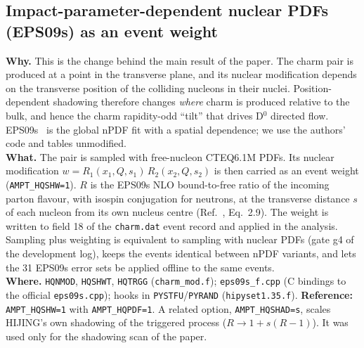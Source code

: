 \documentclass[11pt,a4paper]{article}
\newcommand{\sw}[1]{\texttt{#1}}
\newcommand{\code}[1]{\texttt{#1}}
\begin{document}
\subsection{Impact-parameter-dependent nuclear PDFs (EPS09s) as an event weight}
\textbf{Why.} This is the change behind the main result of the paper. The charm pair is produced at a point in the
transverse plane, and its nuclear modification depends on the transverse position of the colliding nucleons in
their nuclei. Position-dependent shadowing therefore changes \emph{where} charm is produced relative to the bulk,
and hence the charm rapidity-odd ``tilt'' that drives D$^0$ directed flow. EPS09s~\cite{eps09s} is the global nPDF
fit with a spatial dependence; we use the authors' code and tables unmodified.\\
\textbf{What.} The pair is sampled with free-nucleon CTEQ6.1M PDFs. Its nuclear modification
$w=R_1(x_1,Q,s_1)\,R_2(x_2,Q,s_2)$ is then carried as an event weight (\sw{AMPT\_HQSHW=1}). $R$ is the EPS09s NLO
bound-to-free ratio of the incoming parton flavour, with isospin conjugation for neutrons, at the transverse distance
$s$ of each nucleon from its own nucleus centre (Ref.~\cite{eps09s}, Eq.~2.9). The weight is written to field 18
of the \code{charm.dat} event record and applied in the analysis. Sampling plus weighting is equivalent to sampling
with nuclear PDFs (gate g4 of the development log), keeps the events identical between nPDF variants, and lets the
31 EPS09s error sets be applied offline to the same events.\\
\textbf{Where.} \code{HQNMOD}, \code{HQSHWT}, \code{HQTRGG} (\code{charm\_mod.f}); \code{eps09s\_f.cpp} (C bindings to
the official \code{eps09s.cpp}); hooks in \code{PYSTFU}/\code{PYRAND} (\code{hipyset1.35.f}).
\textbf{Reference:} \sw{AMPT\_HQSHW=1} with \sw{AMPT\_HQPDF=1}. A related option, \sw{AMPT\_HQSHAD=s}, scales HIJING's
own shadowing of the triggered process ($R\to1+s(R-1)$). It was used only for the shadowing scan of the paper.
\end{document}
